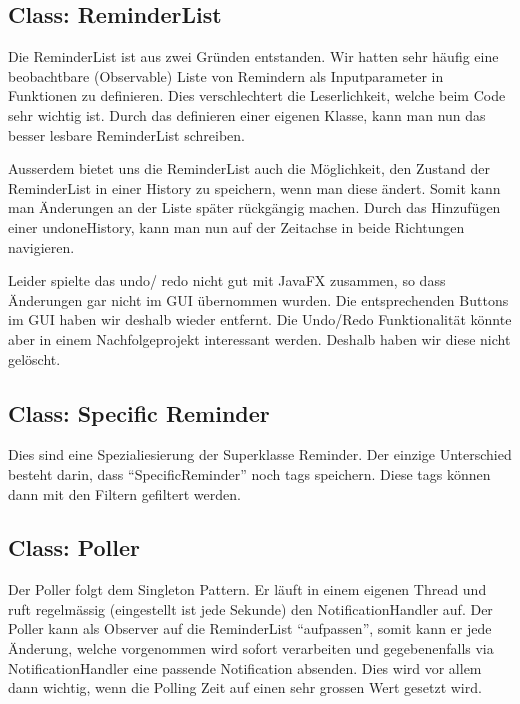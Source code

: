 \subsection{Class: ReminderList}
Die ReminderList ist aus zwei Gründen entstanden.
Wir hatten sehr häufig eine beobachtbare (Observable) Liste von Remindern als Inputparameter in Funktionen zu definieren. Dies verschlechtert die Leserlichkeit, welche beim Code
sehr wichtig ist. Durch das definieren einer eigenen Klasse, kann man nun das besser lesbare ReminderList schreiben.

Ausserdem bietet uns die ReminderList auch die Möglichkeit, den Zustand der ReminderList in einer History zu speichern, wenn man diese ändert.
Somit kann man Änderungen an der Liste später rückgängig machen. Durch das Hinzufügen einer undoneHistory, kann man nun auf der Zeitachse in beide Richtungen navigieren.

Leider spielte das undo/ redo nicht gut mit JavaFX zusammen, so dass Änderungen gar nicht im GUI übernommen wurden. Die entsprechenden Buttons im GUI haben wir deshalb wieder entfernt.
Die Undo/Redo Funktionalität könnte aber in einem Nachfolgeprojekt interessant werden. Deshalb haben wir diese nicht gelöscht.

\subsection{Class: Specific Reminder}
Dies sind eine Spezialiesierung der Superklasse Reminder. Der einzige Unterschied besteht darin, dass ``SpecificReminder'' noch tags speichern. Diese tags können dann mit den
Filtern gefiltert werden.

\subsection{Class: Poller}
Der Poller folgt dem Singleton Pattern. Er läuft in einem eigenen Thread und ruft regelmässig (eingestellt ist jede Sekunde) den NotificationHandler auf.
Der Poller kann als Observer auf die ReminderList ``aufpassen'', somit kann er jede Änderung, welche vorgenommen wird sofort verarbeiten und gegebenenfalls via NotificationHandler
eine passende Notification absenden. Dies wird vor allem dann wichtig, wenn die Polling Zeit auf einen sehr grossen Wert gesetzt wird.

